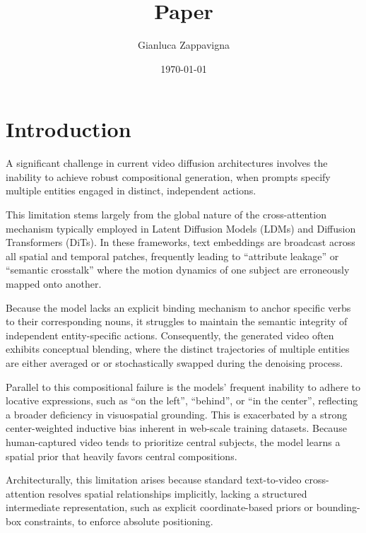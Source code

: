 \documentclass{article}
\title{Paper}
\author{Gianluca Zappavigna}
\date{\today}
\begin{document}
\maketitle

\section{Introduction}

A significant challenge in current video diffusion architectures involves the inability to achieve robust compositional generation, when prompts specify multiple entities engaged in distinct, independent actions.

This limitation stems largely  from the global nature of the cross-attention mechanism typically employed in Latent Diffusion Models (LDMs) and Diffusion Transformers (DiTs). In these frameworks, text embeddings are broadcast across all spatial and temporal patches, frequently leading to ``attribute leakage'' or ``semantic crosstalk'' where the motion dynamics of one subject are erroneously mapped onto another.

Because the model lacks an explicit binding mechanism to anchor specific verbs to their corresponding nouns, it struggles to maintain the semantic integrity of independent entity-specific actions. Consequently, the generated video often exhibits conceptual blending, where the distinct trajectories of multiple entities are either averaged or or stochastically swapped during the denoising process.

Parallel to this compositional failure is the models' frequent inability to adhere to locative expressions, such as ``on the left'', ``behind'', or ``in the center'', reflecting a broader deficiency in visuospatial grounding.
This is exacerbated by a strong center-weighted inductive bias inherent in web-scale training datasets. Because human-captured video tends to prioritize central subjects, the model learns a spatial prior that heavily favors central compositions.

Architecturally, this limitation arises because standard text-to-video cross-attention resolves spatial relationships implicitly, lacking a structured intermediate representation, such as explicit coordinate-based priors or bounding-box constraints, to enforce absolute positioning.
\end{document}
